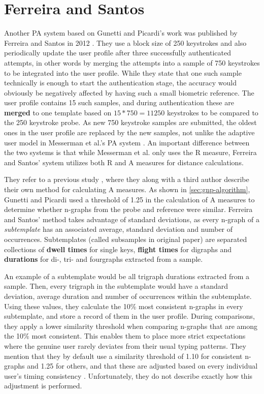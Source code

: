 \documentclass[informationsecurity]{gucmasterproject}
\begin{document}
\chapter{Ferreira and Santos}
Another PA system based on Gunetti and Picardi's work was published by Ferreira and Santos in 2012 \cite{superResults}.
They use a block size of 250 keystrokes and also periodically update the user profile after three successfully authenticated attempts, in other words by merging the attempts into a sample of 750 keystrokes to be integrated into the user profile.
While they state that one such sample technically is enough to start the authentication stage, the accuracy would obviously be negatively affected by having such a small biometric reference.
The user profile contains 15 such samples, and during authentication these are \textbf{merged} to one template based on $15*750 = 11250$ keystrokes to be compared to the 250 keystroke probe. 
As new 750 keystroke samples are submitted, the oldest ones in the user profile are replaced by the new samples, not unlike the adaptive user model in Messerman et al.'s PA system \cite{Messerman}.
An important difference between the two systems is that while Messerman et al. only uses the R measure, Ferreira and Santos' system utilizes both R and A measures for distance calculations.

They refer to a previous study \cite{superOld}, where they along with a third author describe their own method for calculating A measures.
As shown in \autoref{sec:gnp-algorithm}, Gunetti and Picardi used a threshold of 1.25 in the calculation of A measures to determine whether n-graphs from the probe and reference were similar.
Ferreira and Santos' method takes advantage of standard deviations, as every n-graph of a \textit{subtemplate} has an associated average, standard deviation and number of occurrences.
Subtemplates (called subsamples in original paper) are separated collections of \textbf{dwell times} for single keys, \textbf{flight times} for digraphs and \textbf{durations} for di-, tri- and fourgraphs extracted from a sample.

An example of a subtemplate would be all trigraph durations extracted from a sample.
Then, every trigraph in the subtemplate would have a standard deviation, average duration and number of occurrences within the subtemplate.
Using these values, they calculate the 10\% most consistent n-graphs in every subtemplate, and store a record of them in the user profile.
During comparisons, they apply a lower similarity threshold when comparing n-graphs that are among the 10\% most consistent.
This enables them to place more strict expectations where the genuine user rarely deviates from their usual typing patterns.
They mention that they by default use a similarity threshold of 1.10 for consistent n-graphs and 1.25 for others, and that these are adjusted based on every individual user's timing consistency \cite{superOld}.
Unfortunately, they do not describe exactly how this adjustment is performed.
\end{document}
